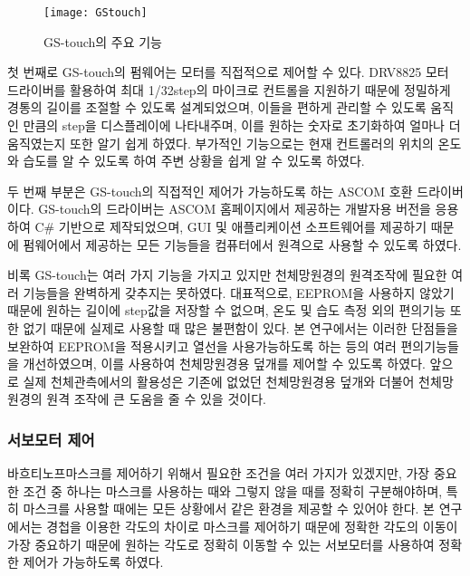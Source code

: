 \bigskip
\begin{figure}[h]
	\begin{center}
		\texttt{[image: GStouch]}
	\end{center}
	\caption{GS-touch의 주요 기능}
	\label{GStocuh}
\end{figure}

첫 번째로 GS-touch의 펌웨어는 모터를 직접적으로 제어할 수 있다. DRV8825 모터 드라이버를 활용하여 최대 1/32step의 마이크로 컨트롤을 지원하기 때문에 정밀하게 경통의 길이를 조절할 수 있도록 설계되었으며, 이들을 편하게 관리할 수 있도록 움직인 만큼의 step을 디스플레이에 나타내주며, 이를 원하는 숫자로 초기화하여 얼마나 더 움직였는지 또한 알기 쉽게 하였다. 부가적인 기능으로는 현재 컨트롤러의 위치의 온도와 습도를 알 수 있도록 하여 주변 상황을 쉽게 알 수 있도록 하였다.

두 번째 부분은 GS-touch의 직접적인 제어가 가능하도록 하는 ASCOM 호환 드라이버이다. GS-touch의 드라이버는 ASCOM 홈페이지에서 제공하는 개발자용 버전을 응용하여 C\# 기반으로 제작되었으며, GUI 및 애플리케이션 소프트웨어를 제공하기 때문에 펌웨어에서 제공하는 모든 기능들을 컴퓨터에서 원격으로 사용할 수 있도록 하였다.


비록 GS-touch는 여러 가지 기능을 가지고 있지만 천체망원경의 원격조작에 필요한 여러 기능들을 완벽하게 갖추지는 못하였다. 대표적으로, EEPROM을 사용하지 않았기 때문에 원하는 길이에 step값을 저장할 수 없으며, 온도 및 습도 측정 외의 편의기능 또한 없기 때문에 실제로 사용할 때 많은 불편함이 있다. 본 연구에서는 이러한 단점들을 보완하여 EEPROM을 적용시키고 열선을 사용가능하도록 하는 등의 여러 편의기능들을 개선하였으며, 이를 사용하여 천체망원경용 덮개를 제어할 수 있도록 하였다. 앞으로 실제 천체관측에서의 활용성은 기존에 없었던 천체망원경용 덮개와 더불어 천체망원경의 원격 조작에 큰 도움을 줄 수 있을 것이다.


\subsubsection{서보모터 제어}
바흐티노프마스크를 제어하기 위해서 필요한 조건을 여러 가지가 있겠지만, 가장 중요한 조건 중 하나는 마스크를 사용하는 때와 그렇지 않을 때를 정확히 구분해야하며, 특히 마스크를 사용할 때에는 모든 상황에서 같은 환경을 제공할 수 있어야 한다. 본 연구에서는 경첩을 이용한 각도의 차이로 마스크를 제어하기 때문에 정확한 각도의 이동이 가장 중요하기 때문에 원하는 각도로 정확히 이동할 수 있는 서보모터를 사용하여 정확한 제어가 가능하도록 하였다.


